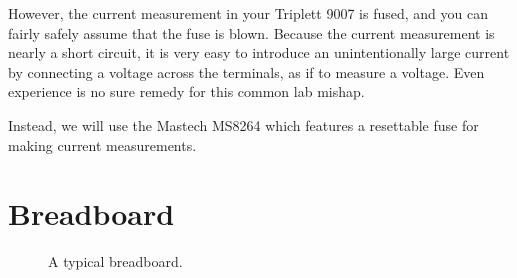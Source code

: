 However, the current measurement in your Triplett 9007 is fused, and
you can fairly safely assume that the fuse is blown.  Because the
current measurement is nearly a short circuit, it is very easy to
introduce an unintentionally large current by connecting a voltage
across the terminals, as if to measure a voltage.  Even experience is no
sure remedy for this common lab mishap.

Instead, we will use the Mastech MS8264 which features a resettable
fuse for making current measurements.

\section{Breadboard}

\begin{figure}[htbp]
\begin{center}
\caption{A typical breadboard.}
\end{center}
\end{figure}

